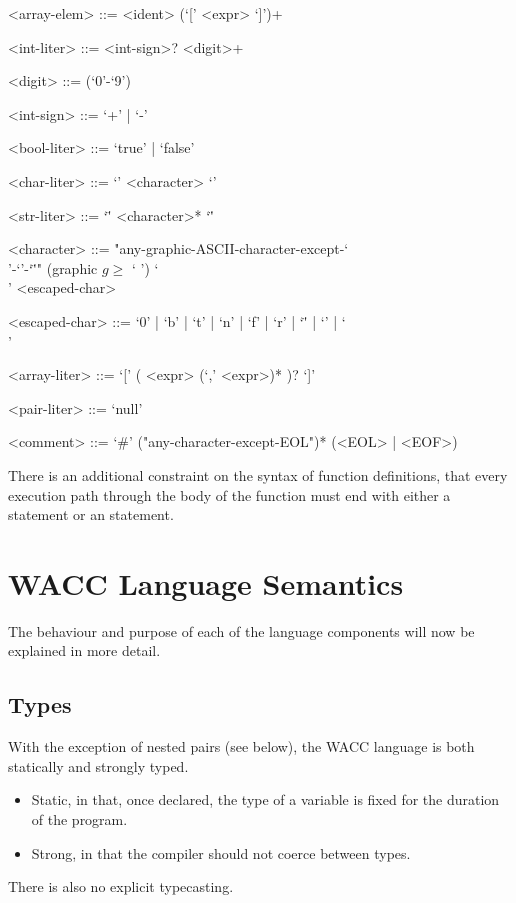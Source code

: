 \documentclass[a4paper]{article}
\theoremstyle{definition}
\begin{document}
\begin{grammar}
  <array-elem> ::= <ident> (`[' <expr> `]')+

  <int-liter> ::= <int-sign>? <digit>+

  <digit> ::= (`0'-`9')

  <int-sign> ::= `+' | `-'

  <bool-liter> ::= `true' | `false'

  <char-liter> ::= `\textquotesingle' <character> `\textquotesingle'

  <str-liter> ::= `\"' <character>* `\"'

  <character> ::= "any-graphic-ASCII-character-except-`\\'-`\textquotesingle'-`\"'" \hfill (graphic $g \geq$ {\ttfamily ` '})
    \alt `\\' <escaped-char>

  <escaped-char> ::= `0' | `b' | `t' | `n' | `f' | `r' | `\"' | `\textquotesingle' | `\\'

  <array-liter> ::= `[' ( <expr> (`,' <expr>)* )? `]'

  <pair-liter> ::= `null'

  <comment> ::= `#' ("any-character-except-EOL")* (<EOL> | <EOF>)
\end{grammar}

 There is an additional constraint on the syntax of function definitions,
that every execution path through the body of the function must end with either a  statement or an  statement.


\section{WACC Language Semantics}
The behaviour and purpose of each of the language components will now be explained in more detail.

\subsection{Types}
With the exception of nested pairs (see below), the WACC language is both statically and strongly typed.
\begin{itemize}
  \item Static, in that, once declared, the type of a variable is fixed for the duration of the program.
  \item Strong, in that the compiler should not coerce between types.
\end{itemize}
There is also no explicit typecasting.
\end{document}
